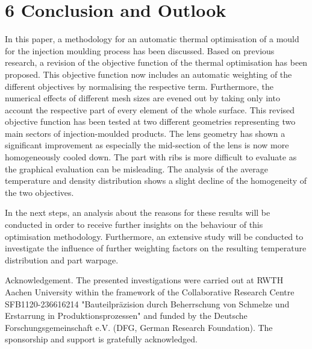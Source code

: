 \documentclass[10pt]{article}
\begin{document}
\section*{6 Conclusion and Outlook}
In this paper, a methodology for an automatic thermal optimisation of a mould for the injection moulding process has been discussed. Based on previous research, a revision of the objective function of the thermal optimisation has been proposed. This objective function now includes an automatic weighting of the different objectives by normalising the respective term. Furthermore, the numerical effects of different mesh sizes are evened out by taking only into account the respective part of every element of the whole surface. This revised objective function has been tested at two different geometries representing two main sectors of injection-moulded products. The lens geometry has shown a significant improvement as especially the mid-section of the lens is now more homogeneously cooled down. The part with ribs is more difficult to evaluate as the graphical evaluation can be misleading. The analysis of the average temperature and density distribution shows a slight decline of the homogeneity of the two objectives.

In the next steps, an analysis about the reasons for these results will be conducted in order to receive further insights on the behaviour of this optimisation methodology. Furthermore, an extensive study will be conducted to investigate the influence of further weighting factors on the resulting temperature distribution and part warpage.

Acknowledgement. The presented investigations were carried out at RWTH Aachen University within the framework of the Collaborative Research Centre SFB1120-236616214 "Bauteilpräzision durch Beherrschung von Schmelze und Erstarrung in Produktionsprozessen" and funded by the Deutsche Forschungsgemeinschaft e.V. (DFG, German Research Foundation). The sponsorship and support is gratefully acknowledged.
\end{document}
